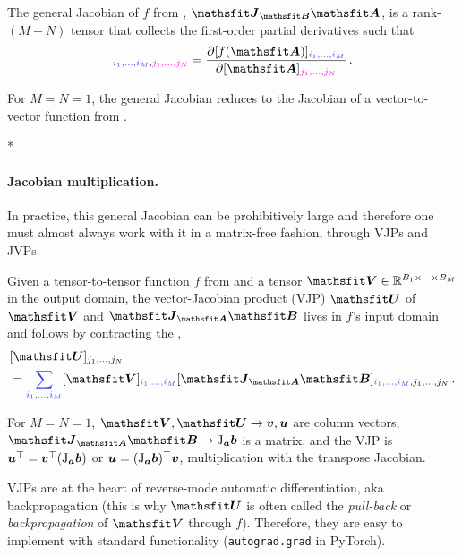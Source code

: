 \begin{definition}\label{def:general_jacobian}
  The general Jacobian of $f$ from , $\tJ_{\tB}\tA$, is a rank-$(M+N)$ tensor that collects the first-order partial derivatives such that
  \begin{align*}
    [\tJ_{\tA}\tB]_{\colored{i_1, \dots, i_M}, \colored[VectorPink]{j_1, \dots, j_N}}
    =
    \frac{\partial [f(\tA)]_{\colored{i_1, \dots, i_M}}}{\partial [\tA]_{\colored[VectorPink]{j_1, \dots, j_N}}}\,.
  \end{align*}
\end{definition}
For $M=N=1$, the general Jacobian reduces to the Jacobian of a vector-to-vector function from .

\switchcolumn[1]*
\switchcolumn[0]

\paragraph{Jacobian multiplication.} In practice, this general Jacobian can be prohibitively large and therefore one must almost always work with it in a matrix-free fashion, \ie through VJPs and JVPs.

\begin{definition}\label{def:vjp}
  Given a tensor-to-tensor function $f$ from  and a tensor $\tV \in \sR^{B_1 \times \dots \times B_M}$ in the output domain, the vector-Jacobian product (VJP) $\tU$ of $\tV$ and $\tJ_{\tA}\tB$ lives in $f$'s input domain and follows by contracting the ,
  \begin{align*}
    & [\tU]_{j_1, \dots, j_N}
    \\
    & =
      \colored{\sum_{i_1, \dots, i_M}}
      [\tV]_{\colored{i_1, \dots, i_M}}
      [\tJ_{\tA}\tB]_{\colored{i_1, \dots, i_M}, j_1, \dots, j_N}\,.
  \end{align*}
\end{definition}
For $M=N=1$, $\tV, \tU \to \vv, \vu$ are column vectors, $\tJ_{\tA}\tB \to \jac_{\va}\vb$ is a matrix, and the VJP is ${\bm{u}}^{\top} = {\bm{v}}^{\top} (\mathrm{J}_{{\bm{a}}}{\bm{b}})$ or ${\bm{u}} = (\mathrm{J}_{{\bm{a}}}{\bm{b}})^{\top} {\bm{v}}$, \ie multiplication with the transpose Jacobian.

VJPs are at the heart of reverse-mode automatic differentiation, aka backpropagation (this is why $\tU$ is often called the \emph{pull-back} or \emph{backpropagation} of $\tV$ through $f$).
Therefore, they are easy to implement with standard functionality (\eg \texttt{autograd.grad} in PyTorch).

